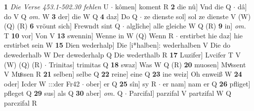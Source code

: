 \documentclass[8pt,a4paper,notitlepage]{article}
\begin{document}
\begin{table}[ht]
\begin{minipage}[t]{0.5\linewidth}
\textbf{1} \textit{Die Verse 453.1-502.30 fehlen} U   $\cdot$ kômen] koment R \textbf{2} die nû] Vnd die Q  $\cdot$ dâ] do V Q \textit{om.} W \textbf{3} der] die W Q \textbf{4} daz] Do Q  $\cdot$ ze dienste sol] sol ze dienste V (W) (Q) (R) \textbf{6} vröunt sich] Frewndt sint Q  $\cdot$ alglîche] alle gleiche W Q (R) \textbf{9} in] \textit{om.} T \textbf{10} vor] Von V \textbf{13} swennin] Wenne in W (Q) Wenn R  $\cdot$ erstirbet hie daz] hie erstirbet sein W \textbf{15} Dien wederhalp] Die [i*halben]: wederhalben V Die do dewederhalb W Der dewederhalp Q Die wederthalb R \textbf{17} Luzifer] Lvcifer T V (W) (Q) (R)  $\cdot$ Trinitas] trimitas Q \textbf{18} swaz] Was W Q (R) \textbf{20} muosen] Mvͤssent V Muͦssen R \textbf{21} selben] selbe Q \textbf{22} reine] eine Q \textbf{23} ine weiz] Oh enweiß W \textbf{24} oder] Icder W :::der Fr42  $\cdot$ ober] er Q \textbf{25} sîn] sy R  $\cdot$ er nam] nam er Q \textbf{26} pfliget] pfleget Q \textbf{29} sus] als Q \textbf{30} aber] \textit{om.} Q  $\cdot$ Parcifal] parzifal V partzifal W Q parczifal R \newline
\end{minipage}
\end{table}
\end{document}
